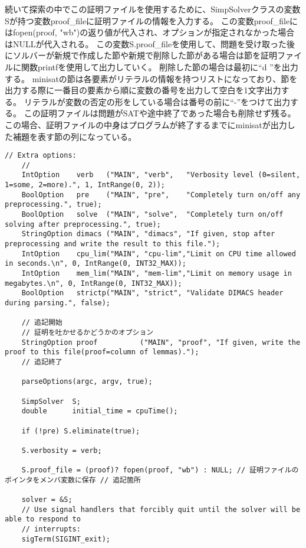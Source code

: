 続いて探索の中でこの証明ファイルを使用するために、SimpSolverクラスの変数Sが持つ変数proof\_fileに証明ファイルの情報を入力する。
この変数proof\_fileにはfopen(proof, "wb")の返り値が代入され、オプションが指定されなかった場合はNULLが代入される。
この変数S.proof\_fileを使用して、問題を受け取った後にソルバーが新規で作成した節や新規で削除した節がある場合は節を証明ファイルに関数printfを使用して出力していく。
削除した節の場合は最初に``d ''を出力する。
minisatの節は各要素がリテラルの情報を持つリストになっており、節を出力する際に一番目の要素から順に変数の番号を出力して空白を1文字出力する。
リテラルが変数の否定の形をしている場合は番号の前に``-''をつけて出力する。
この証明ファイルは問題がSATや途中終了であった場合も削除せず残る。
この場合、証明ファイルの中身はプログラムが終了するまでにminisatが出力した補題を表す節の列になっている。
\begin{lstlisting}[caption=オプションを定義するための関数mainの変更(simp/Main.cc), firstnumber=60]
    // Extra options:
    //
    IntOption    verb   ("MAIN", "verb",   "Verbosity level (0=silent, 1=some, 2=more).", 1, IntRange(0, 2));
    BoolOption   pre    ("MAIN", "pre",    "Completely turn on/off any preprocessing.", true);
    BoolOption   solve  ("MAIN", "solve",  "Completely turn on/off solving after preprocessing.", true);
    StringOption dimacs ("MAIN", "dimacs", "If given, stop after preprocessing and write the result to this file.");
    IntOption    cpu_lim("MAIN", "cpu-lim","Limit on CPU time allowed in seconds.\n", 0, IntRange(0, INT32_MAX));
    IntOption    mem_lim("MAIN", "mem-lim","Limit on memory usage in megabytes.\n", 0, IntRange(0, INT32_MAX));
    BoolOption   strictp("MAIN", "strict", "Validate DIMACS header during parsing.", false);

    // 追記開始
    // 証明を吐かせるかどうかのオプション
    StringOption proof          ("MAIN", "proof", "If given, write the proof to this file(proof=column of lemmas).");
    // 追記終了

    parseOptions(argc, argv, true);
        
    SimpSolver  S;
    double      initial_time = cpuTime();

    if (!pre) S.eliminate(true);

    S.verbosity = verb;

    S.proof_file = (proof)? fopen(proof, "wb") : NULL; // 証明ファイルのポインタをメンバ変数に保存 // 追記箇所
        
    solver = &S;
    // Use signal handlers that forcibly quit until the solver will be able to respond to
    // interrupts:
    sigTerm(SIGINT_exit);
\end{lstlisting}
